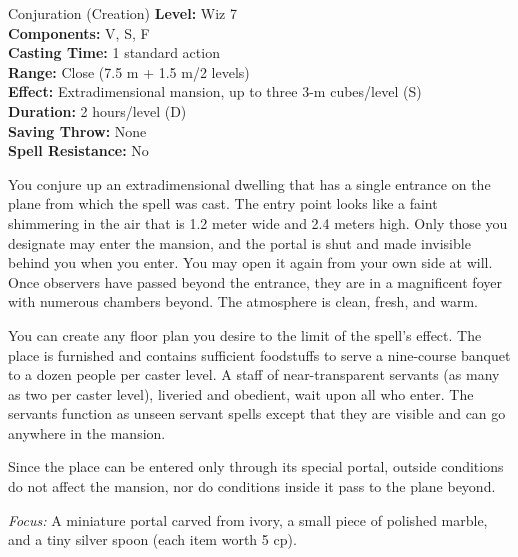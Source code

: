 {Conjuration (Creation)}
{
	\textbf{Level:}
	Wiz 7\\
	\textbf{Components:}
	V, S, F\\
	\textbf{Casting Time:}
	1 standard action\\
	\textbf{Range:}
	Close (7.5 m + 1.5 m/2 levels)\\
	\textbf{Effect:}
	Extradimensional mansion, up to three 3-m cubes/level (S)\\
	\textbf{Duration:}
	2 hours/level (D)\\
	\textbf{Saving Throw:}
	None\\
	\textbf{Spell Resistance:}
	No\\
}
{
	You conjure up an extradimensional dwelling that has a single entrance on the plane from which the spell was cast. The entry point looks like a faint shimmering in the air that is 1.2 meter wide and 2.4 meters high. Only those you designate may enter the mansion, and the portal is shut and made invisible behind you when you enter. You may open it again from your own side at will. Once observers have passed beyond the entrance, they are in a magnificent foyer with numerous chambers beyond. The atmosphere is clean, fresh, and warm.

	You can create any floor plan you desire to the limit of the spell's effect. The place is furnished and contains sufficient foodstuffs to serve a nine-course banquet to a dozen people per caster level. A staff of near-transparent servants (as many as two per caster level), liveried and obedient, wait upon all who enter. The servants function as unseen servant spells except that they are visible and can go anywhere in the mansion.

	Since the place can be entered only through its special portal, outside conditions do not affect the mansion, nor do conditions inside it pass to the plane beyond.

	\textit{Focus:}
	A miniature portal carved from ivory, a small piece of polished marble, and a tiny silver spoon (each item worth 5 cp).

}
